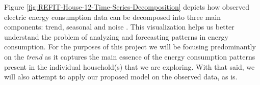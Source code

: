 \begin{figure}[hbt!]
        \begin{adjustwidth*}{-3.0cm}{-3.0cm}%
                \myfloatalign
                 \quad
                 \quad
                \caption{}
                \label{fig:REFIT-Distribution}
        \end{adjustwidth*}
\end{figure}

\noindent \newline Figure \ref{fig:REFIT-House-12-Time-Series-Decomposition} depicts how observed electric energy consumption data can be decomposed into three main components: trend, seasonal and noise \cite{Chujai}. This visualization helps us better understand the problem of analyzing and forecasting patterns in energy consumption. For the purposes of this project we will be focusing predominantly on the \textit{trend} as it captures the main essence of the energy consumption patterns present in the individual household(s) that we are exploring. With that said, we will also attempt to apply our proposed model on the observed data, as is.

